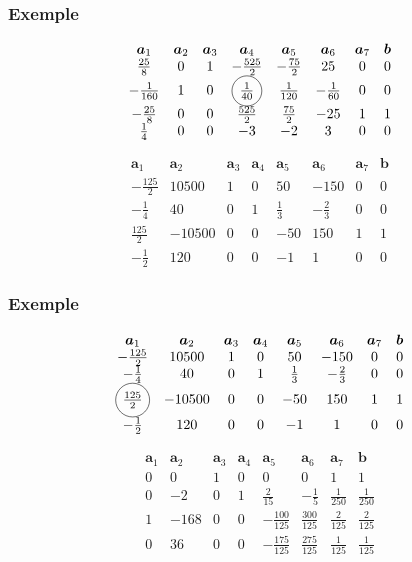 \documentclass[usepdftitle=false]{beamer}
\newcommand*\circled[1]{\tikz[baseline=(char.base)]{
		\node[shape=circle,draw,inner sep=2pt] (char) {#1};}}
\def\ba{\boldsymbol{a}}
\def\bb{\boldsymbol{b}}
\begin{document}
\begin{frame}
\frametitle{Exemple}

\[
\begin{matrix}
\ba_1 & \ba_2 & \ba_3 & \ba_4 & \ba_5 &\ba_6 &\ba_7 & \bb \\
\frac{25}{8} & 0 & 1 & -\frac{525}{2} & -\frac{75}{2} & 25 & 0 & 0 \\
-\frac{1}{160} & 1 & 0 & \circled{$\frac{1}{40}$} & \frac{1}{120} & -\frac{1}{60} & 0 & 0 \\
-\frac{25}{8} & 0 & 0 & \frac{525}{2} & \frac{75}{2} & -25 & 1 & 1 \\
\frac{1}{4} & 0 & 0 & -3 & -2 & 3 & 0 & 0
\end{matrix}
\]

\[
\begin{matrix}
\ba_1 & \ba_2 & \ba_3 & \ba_4 & \ba_5 &\ba_6 &\ba_7 & \bb \\
-\frac{125}{2} & 10500 & 1 & 0 & 50 & -150 & 0 & 0 \\
-\frac{1}{4} & 40 & 0 & 1 & \frac{1}{3} & -\frac{2}{3} & 0 & 0 \\
\frac{125}{2} & -10500 & 0 & 0 & -50 & 150 & 1 & 1 \\
-\frac{1}{2} & 120 & 0 & 0 & -1 & 1 & 0 & 0
\end{matrix}
\]

\end{frame}

\begin{frame}
\frametitle{Exemple}

\[
\begin{matrix}
\ba_1 & \ba_2 & \ba_3 & \ba_4 & \ba_5 &\ba_6 &\ba_7 & \bb \\
-\frac{125}{2} & 10500 & 1 & 0 & 50 & -150 & 0 & 0 \\
-\frac{1}{4} & 40 & 0 & 1 & \frac{1}{3} & -\frac{2}{3} & 0 & 0 \\
\circled{$\frac{125}{2}$} & -10500 & 0 & 0 & -50 & 150 & 1 & 1 \\
-\frac{1}{2} & 120 & 0 & 0 & -1 & 1 & 0 & 0
\end{matrix}
\]

\[
\begin{matrix}
\ba_1 & \ba_2 & \ba_3 & \ba_4 & \ba_5 &\ba_6 &\ba_7 & \bb \\
0 & 0 & 1 & 0 & 0 & 0 & 1 & 1 \\
0 & -2 & 0 & 1 & \frac{2}{15} & -\frac{1}{5} & \frac{1}{250} & \frac{1}{250} \\
1 & -168 & 0 & 0 & -\frac{100}{125} & \frac{300}{125} & \frac{2}{125} & \frac{2}{125} \\
0 & 36 & 0 & 0 & -\frac{175}{125} & \frac{275}{125} & \frac{1}{125} & \frac{1}{125}
\end{matrix}
\]

\end{frame}
\end{document}
